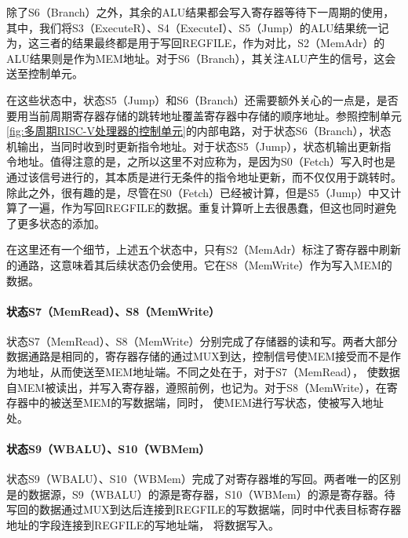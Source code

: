 除了S6（Branch）之外，其余的ALU结果都会写入寄存器等待下一周期的使用，其中，我们将S3（ExecuteR）、S4（ExecuteI）、S5（Jump）的ALU结果统一记为，这三者的结果最终都是用于写回REGFILE，作为对比，S2（MemAdr）的ALU结果则是作为MEM地址。对于S6（Branch），其关注ALU产生的信号，这会送至控制单元。

在这些状态中，状态S5（Jump）和S6（Branch）还需要额外关心的一点是，是否要用当前周期寄存器存储的跳转地址覆盖寄存器中存储的顺序地址。参照控制单元\cref{fig:多周期RISC-V处理器的控制单元}的内部电路，对于状态S6（Branch），状态机输出，当同时收到时更新指令地址。对于状态S5（Jump），状态机输出更新指令地址。值得注意的是，之所以这里不对应称为，是因为S0（Fetch）写入时也是通过该信号进行的，其本质是进行无条件的指令地址更新，而不仅仅用于跳转时。除此之外，很有趣的是，尽管在S0（Fetch）已经被计算，但是S5（Jump）中又计算了一遍，作为写回REGFILE的数据。重复计算听上去很愚蠢，但这也同时避免了更多状态的添加。

在这里还有一个细节，上述五个状态中，只有S2（MemAdr）标注了寄存器中刷新的通路，这意味着其后续状态仍会使用。它在S8（MemWrite）作为写入MEM的数据。

\paragraph{状态S7（MemRead）、S8（MemWrite）}
状态S7（MemRead）、S8（MemWrite）分别完成了存储器的读和写。两者大部分数据通路是相同的，寄存器存储的通过MUX到达，控制信号使MEM接受而不是作为地址，从而使送至MEM地址端。不同之处在于，对于S7（MemRead）， 使数据\code{[imm(rs1)]}自MEM被读出，并写入寄存器，遵照前例，也记为。对于S8（MemWrite），在寄存器中的被送至MEM的写数据端，同时， 使MEM进行写状态，使被写入地址处。

\paragraph{状态S9（WBALU）、S10（WBMem）}
状态S9（WBALU）、S10（WBMem）完成了对寄存器堆的写回。两者唯一的区别是的数据源，S9（WBALU）的源是寄存器，S10（WBMem）的源是寄存器。待写回的数据通过MUX到达后连接到REGFILE的写数据端，同时中代表目标寄存器地址的字段连接到REGFILE的写地址端， 将数据写入。


